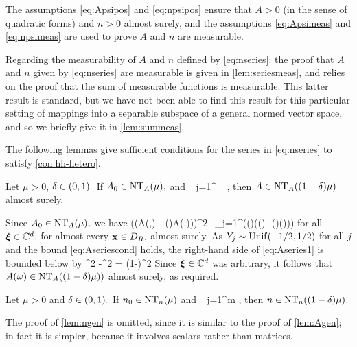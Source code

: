 The assumptions \eqref{eq:Apsipos} and \eqref{eq:npsipos} ensure that $A > 0$ (in the sense of quadratic forms) and $n > 0$  almost surely, and the assumptions \eqref{eq:Apsimeas} and \eqref{eq:npsimeas} are used to prove $A$ and $n$ are measurable.

Regarding the measurability of $A$ and $n$ defined by \eqref{eq:nseries}: the proof that $A$ and $n$ given by \eqref{eq:nseries} are measurable is given in \cref{lem:seriesmeas}, and relies on the proof that the sum of measurable functions
is measurable. This latter result is standard, but we have not been able to find this result for this particular setting of mappings
into a separable subspace of a general normed vector space, and so we briefly give it in \cref{lem:summeas}. 

The following lemmas give sufficient conditions for the series in \eqref{eq:nseries} to satisfy \cref{con:hh-hetero}.

\label{lem:Agen}
Let $\mu > 0$, $\delta \in \mleft(0,1\mright).$ If $\Az \in \NTA{\mu},$ and
\beq\label{eq:Aseriescond}
\sum_{j=1}^\infty \esssup_{\bx \in \DR} \NopCCd{\Psij(\bx) - \mleft(\bx\cdot\grad\mright)\Psij(\bx)} \delta\mu,
\eeq
then $A \in \NTA{(1-\delta)\mu}$ almost surely.
\ele

Since $\Az \in \NTA{\mu},$ we have 
\beq\label{eq:Aseries1}
\Big(\mleft(A(\omega,\bx) - \mleft(\bx\cdot\grad\mright)A(\omega,\bx)\mright)\bxi\Big)\cdot\bxib \geq\mu \abs{\bxi}^2+\sum_{j=1}^\infty  \Big(\Yj(\omega)\mleft(\Psij(\bx)- \mleft(\bx\cdot\grad\mright)\Psij(\bx)\mright)\bxi\Big)\cdot\bxib
\eeq
for all $\boldsymbol{\xi} \in \mathbb C^{d},$ for almost every $\mathbf{x} \in D_{R},$ almost surely. As $Y_{j} \sim \mathrm{Unif}(-1/2,1/2)$ for all $j$ and the bound \eqref{eq:Aseriescond} holds, the right-hand side of \eqref{eq:Aseries1} is bounded below by
\beqs
\mu \abs{\bxi}^2 -\delta \mu \abs{\bxi}^2 = (1-\delta)\mu\abs{\bxi}^2
\eeqs
Since $\boldsymbol{\xi} \in \mathbb C^{d}$ was arbitrary, it follows that $A(\omega) \in \NTA{(1-\delta)\mu)}$ almost surely, as required.
\epf

\label{lem:ngen}
Let $\mu > 0$ and $\delta \in \mleft(0,1\mright).$ If $\nz \in \NTn{\mu}$ and
\beq\label{eq:nseriescond}
\sum_{j=1}^m\NLiDRRR{\psij(\bx) + \bx\cdot\grad\psij(\bx)} \delta\mu,
\eeq
then $n \in \NTn{(1-\delta)\mu}.$
\ele

The proof of \cref{lem:ngen} is omitted, since it is similar to the proof of \cref{lem:Agen}; in fact it is simpler, because it involves scalars rather than matrices.
